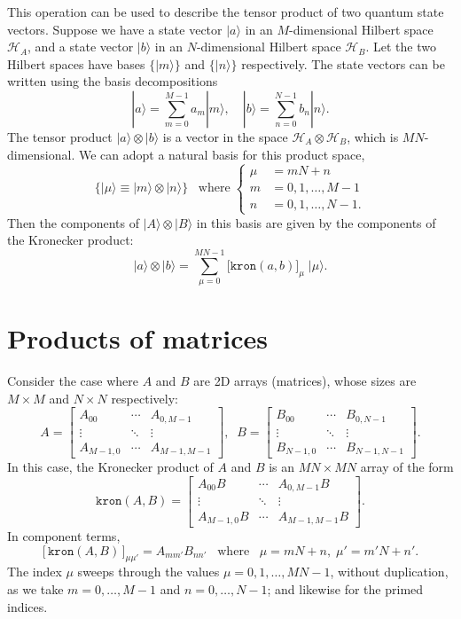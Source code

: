 \documentclass[pra,12pt]{revtex4}
\begin{document}
This operation can be used to describe the tensor product of two
quantum state vectors.  Suppose we have a state vector $|a\rangle$ in
an $M$-dimensional Hilbert space $\mathscr{H}_A$, and a state vector
$|b\rangle$ in an $N$-dimensional Hilbert space $\mathscr{H}_B$.  Let
the two Hilbert spaces have bases $\{|m\rangle\}$ and $\{|n\rangle\}$
respectively.  The state vectors can be written using the basis
decompositions
$$|a\rangle = \sum_{m=0}^{M-1} a_m |m\rangle, \quad |b\rangle = \sum_{n=0}^{N-1} b_n |n\rangle.$$
The tensor product $|a\rangle\otimes|b\rangle$ is a vector in the
space $\mathscr{H}_A\otimes \mathscr{H}_B$, which is $MN$-dimensional.
We can adopt a natural basis for this product space,
$$\Big\{|\mu\rangle \equiv |m\rangle\otimes |n\rangle\Big\} \;\;\;\mathrm{where} \;\begin{cases}\mu\!\!\!\! &= mN+n \\ m \!\!\!\!&= 0,1,\dots,M-1 \\ n \!\!\!\!&= 0,1, \dots, N-1.\end{cases}$$
Then the components of $|A\rangle\otimes|B\rangle$ in this basis are
given by the components of the Kronecker product:
$$|a\rangle\otimes|b\rangle = \sum_{\mu=0}^{MN-1} \big[\texttt{kron}(a,b)\big]_\mu \; |\mu\rangle.$$

\section{Products of matrices}

Consider the case where $A$ and $B$ are 2D arrays (matrices), whose
sizes are $M\times M$ and $N\times N$ respectively:
$$A = \begin{bmatrix}A_{00} & \cdots & A_{0,M-1} \\ \vdots & \ddots & \vdots \\ A_{M-1,0} & \cdots & A_{M-1,M-1} \end{bmatrix}, \;\; B = \begin{bmatrix}B_{00} & \cdots & B_{0,N-1} \\ \vdots & \ddots & \vdots \\  B_{N-1,0} & \cdots & B_{N-1,N-1} \end{bmatrix}.$$
In this case, the Kronecker product of $A$ and $B$ is an $MN\times MN$
array of the form
$$\texttt{kron}(A,B) = \begin{bmatrix} A_{00}B & \cdots & A_{0,M-1}B \\ \vdots & \ddots & \vdots \\ A_{M-1,0}B & \cdots & A_{M-1,M-1}B\end{bmatrix}.$$
In component terms,
$$\big[\,\texttt{kron}(A,B)\,\big]_{\mu\mu'} = A_{mm'} B_{nn'}\;\;\;\mathrm{where}\;\;\;\mu = mN+n, \; \mu' = m'N+n'.$$
The index $\mu$ sweeps through the values $\mu = 0,1,\dots,MN-1$,
without duplication, as we take $m = 0,\dots,M-1$ and $n =
0,\dots,N-1$; and likewise for the primed indices.
\end{document}
